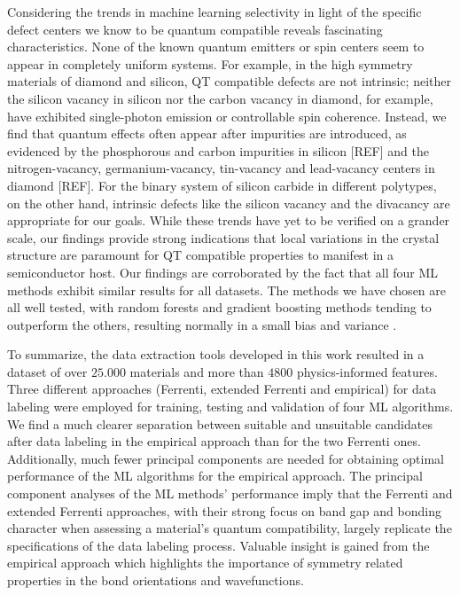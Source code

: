 \documentclass[superscriptaddress,unsortedaddress,
 amsmath,amssymb,
 aps,
]{revtex4-2}
\begin{document}
Considering the trends in machine learning selectivity in light of the specific defect centers we know to be quantum compatible reveals fascinating characteristics. None of the known quantum emitters or spin centers seem to appear in completely uniform systems. For example, in the high symmetry materials of diamond and silicon, QT compatible defects are not intrinsic; neither the silicon vacancy in silicon nor the carbon vacancy in diamond, for example,  have exhibited single-photon emission or controllable spin coherence. Instead, we find that quantum effects often appear after impurities are introduced, as evidenced by the phosphorous and carbon impurities in silicon [REF] and the nitrogen-vacancy, germanium-vacancy, tin-vacancy and lead-vacancy centers in diamond [REF]. 
For the binary system of silicon carbide in different polytypes, on the other hand, intrinsic defects like the silicon vacancy and the divacancy are appropriate for our goals. 
While these trends have yet to be verified on a grander scale, our findings provide strong indications that local variations in the crystal structure are paramount for QT compatible properties to manifest in a semiconductor host. 
Our findings are corroborated by the fact that all four ML methods exhibit similar results for all datasets. The methods we have chosen are all well tested, with random forests and gradient boosting methods tending to outperform the others, resulting normally in a small bias and variance \cite{Hastie2009,Mehta2019,Murphy2012}. 

To summarize, the data extraction tools developed in this work resulted in a dataset of over $25.000$ materials and more than $4800$ physics-informed features. Three different approaches (Ferrenti, extended Ferrenti and empirical) for data labeling were employed for training, testing and validation of four ML algorithms. 
We find a much clearer separation between suitable and unsuitable candidates after data labeling in the empirical approach than for the two Ferrenti ones. 
Additionally, much fewer principal components are needed for obtaining optimal performance of the ML algorithms for the empirical approach. 
The principal component analyses of the ML methods' performance imply that the Ferrenti and extended Ferrenti approaches, with their strong focus on band gap and bonding character when assessing a material's quantum compatibility, largely replicate the specifications of the data labeling process. 
Valuable insight is gained from the empirical approach which highlights the importance of symmetry related properties in the bond orientations and wavefunctions. 
\end{document}
